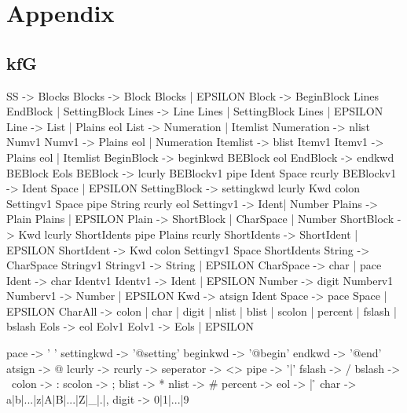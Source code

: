 \chapter{Appendix}
\section{kfG}
\label{AkfG}
\begin{spverbatim}
SS           -> Blocks 
Blocks       -> Block Blocks | EPSILON 
Block        -> BeginBlock Lines EndBlock | SettingBlock
Lines        -> Line Lines | SettingBlock Lines | EPSILON 
Line         -> List | Plains eol
List         -> Numeration | Itemlist 
Numeration   -> nlist Numv1 
Numv1        -> Plains eol | Numeration 
Itemlist     -> blist Itemv1 
Itemv1       -> Plains eol | Itemlist 
BeginBlock   -> beginkwd BEBlock eol
EndBlock     -> endkwd BEBlock Eols
BEBlock      -> lcurly BEBlockv1 pipe Ident Space  rcurly
BEBlockv1    -> Ident Space | EPSILON
SettingBlock -> settingkwd lcurly Kwd colon Settingv1 Space pipe String rcurly eol
Settingv1    -> Ident| Number
Plains       -> Plain Plains | EPSILON
Plain        -> ShortBlock | CharSpace | Number
ShortBlock   -> Kwd lcurly ShortIdents pipe Plains rcurly
ShortIdents  -> ShortIdent | EPSILON 
ShortIdent   -> Kwd colon Settingv1 Space ShortIdents
String       -> CharSpace Stringv1
Stringv1     -> String  | EPSILON
CharSpace    -> char | pace
Ident        -> char Identv1
Identv1      -> Ident | EPSILON
Number       -> digit Numberv1
Numberv1     -> Number | EPSILON
Kwd          -> atsign Ident
Space        -> pace Space | EPSILON
CharAll      -> colon | char | digit | nlist | blist | scolon | percent | fslash | bslash
Eols         -> eol Eolv1
Eolv1        -> Eols | EPSILON



pace       -> ' ' 
settingkwd -> '@setting'
beginkwd   -> '@begin'
endkwd     -> '@end' 
atsign     -> @
lcurly     -> { 
rcurly     -> } 
seperator  -> <> 
pipe       -> '|' 
fslash     -> /
bslash     -> \
colon      -> : 
scolon     -> ; 
blist      -> * 
nlist      -> # 
percent    -> %
eol        -> \n | \r\n 
char       -> a|b|...|z|A|B|...|Z|_|.|,
digit      -> 0|1|...|9
\end{spverbatim}